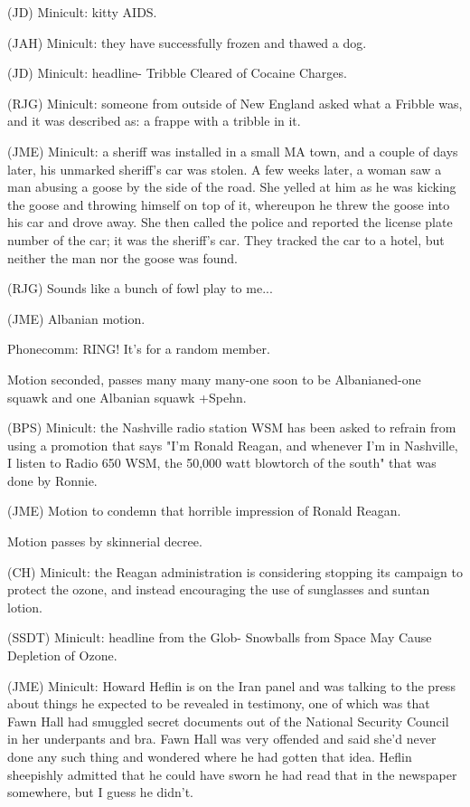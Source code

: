 \documentclass[12pt]{article}
\begin{document}
(JD) Minicult: kitty AIDS.

(JAH) Minicult: they have successfully frozen and thawed a dog.

(JD) Minicult: headline- Tribble Cleared of Cocaine Charges.

(RJG) Minicult: someone from outside of New England asked what a Fribble was, and it was described as: a frappe with a tribble in it.

(JME) Minicult: a sheriff was installed in a small MA town, and a couple of days later, his unmarked sheriff's car was stolen. A few weeks later, a woman saw a man abusing a goose by the side of the road. She yelled at him as he was kicking the goose and throwing himself on top of it, whereupon he threw the goose into his car and drove away. She then called the police and reported the license plate number of the car; it was the sheriff's car. They tracked the car to a hotel, but neither the man nor the goose was found.

(RJG) Sounds like a bunch of fowl play to me...

(JME) Albanian motion.

Phonecomm: RING! It's for a random member.

Motion seconded, passes many many many-one soon to be Albanianed-one squawk and one Albanian squawk +Spehn.

(BPS) Minicult: the Nashville radio station WSM has been asked to refrain from using a promotion that says "I'm Ronald Reagan, and whenever I'm in Nashville, I listen to Radio 650 WSM, the 50,000 watt blowtorch of the south" that was done by Ronnie.

(JME) Motion to condemn that horrible impression of Ronald Reagan.

Motion passes by skinnerial decree.

(CH) Minicult: the Reagan administration is considering stopping its campaign to protect the ozone, and instead encouraging the use of sunglasses and suntan lotion.

(SSDT) Minicult: headline from the Glob- Snowballs from Space May Cause Depletion of Ozone.

(JME) Minicult: Howard Heflin is on the Iran panel and was talking to the press about things he expected to be revealed in testimony, one of which was that Fawn Hall had smuggled secret documents out of the National Security Council in her underpants and bra. Fawn Hall was very offended and said she'd never done any such thing and wondered where he had gotten that idea. Heflin sheepishly admitted that he could have sworn he had read that in the newspaper somewhere, but I guess he didn't.
\end{document}
